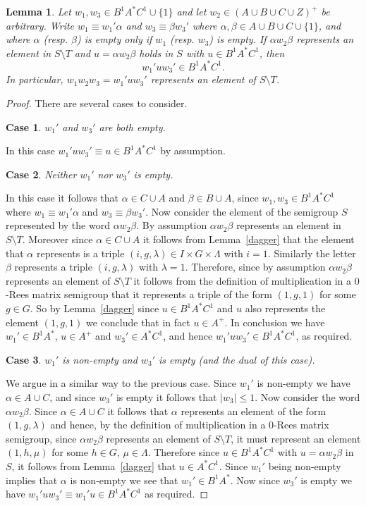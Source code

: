 \documentclass[11pt]{amsart}
\newtheorem{lem}{Lemma}
\theoremstyle{plain}
\newtheorem{case}{Case}
\begin{document}
\begin{lem}\label{trick}
Let $w_1, w_3 \in B^1 A^* C^1 \cup \{ 1 \}$ and let $w_2 \in (A \cup B \cup C \cup Z)^+$ be arbitrary. Write $w_1 \equiv w_1' \alpha$ and $w_3 \equiv \beta w_3'$ where $\alpha, \beta \in A \cup B \cup C \cup \{1 \}$, and where $\alpha$ (resp. $\beta$) is empty only if $w_1$ (resp. $w_3$) is empty. If $\alpha w_2 \beta$ represents an element in $S \setminus T$ and $u =\alpha w_2 \beta$ holds in $S$ with $u \in B^1 A^* C^1$, then
\[
w_1' u w_3' \in B^1 A^* C^1.
\]
In particular, $w_1 w_2 w_3 = w_1' u w_3'$ represents an element of $S \setminus T$. 
\end{lem}
\begin{proof}
There are several cases to consider.
\begin{case}
$w_1'$ and $w_3'$ are both empty. 
\end{case}
In this case $w_1' u w_3' \equiv u \in B^1 A^* C^1$ by assumption. 

\begin{case}
Neither $w_1'$ nor $w_3'$ is empty.
\end{case}
In this case it follows that $\alpha \in C \cup A$ and $\beta \in B \cup A$, since $w_1, w_3 \in B^1 A^* C^1$ where $w_1 \equiv w_1' \alpha$ and $w_3 \equiv \beta w_3'$. Now consider the element of the semigroup $S$ represented by the word $\alpha w_2 \beta$. By assumption  $\alpha w_2 \beta$ represents an element in $S \setminus T$. Moreover since $\alpha \in C \cup A$ it follows from Lemma~\ref{dagger} that the element that $\alpha$ represents is a triple $(i, g, \lambda) \in I \times G \times \Lambda$ with $i=1$. Similarly the letter $\beta$ represents a triple $(i,g,\lambda)$ with $\lambda = 1$. Therefore, since by assumption $\alpha w_2 \beta$ represents an element of $S \setminus T$ it follows from the definition of multiplication in a $0$-Rees matrix semigroup that it represents a triple of the form $(1, g, 1)$ for some $g \in G$. So by Lemma~\ref{dagger} since $u \in B^1 A^* C^1$ and $u$ also represents the element $(1,g,1)$ we conclude that in fact $u \in A^+$. In conclusion we have $w_1' \in B^1 A^*$, $u \in A^+$ and $w_3' \in A^* C^1$, and hence $ w_1' u w_3' \in B^1 A^* C^1$, as required. 

\begin{case}
$w_1'$ is non-empty and $w_3'$ is empty (and the dual of this case).  
\end{case}
We argue in a similar way to the previous case. Since $w_1'$ is non-empty we have $\alpha \in A \cup C$, and since $w_3'$ is empty it follows that $|w_3|\leq 1$. Now consider the word $\alpha w_2 \beta$. Since $\alpha \in A \cup C$ it follows that $\alpha$ represents an element of the form $(1,g,\lambda)$ and hence, by the definition of multiplication in a $0$-Rees matrix semigroup, since $\alpha w_2 \beta$ represents an element of $S \setminus T$, it must represent an element $(1,h,\mu)$ for some $h \in G$, $\mu \in \Lambda$. Therefore since $u \in B^1 A^* C^1$ with $u = \alpha w_2 \beta$ in $S$, it follows from Lemma~\ref{dagger} that $u \in A^* C^1$. Since $w_1'$ being non-empty implies that $\alpha$ is non-empty we see that $w_1' \in B^1 A^*$. Now since $w_3'$ is empty we have $w_1' u w_3' \equiv w_1' u \in B^1 A^* C^1$ as required.


\end{proof}
\end{document}

